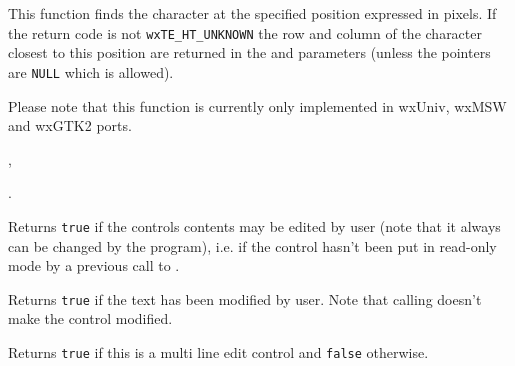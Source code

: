\label{wxtextctrlhittest}


This function finds the character at the specified position expressed in
pixels. If the return code is not \texttt{wxTE\_HT\_UNKNOWN} the row and column
of the character closest to this position are returned in the  and 
 parameters (unless the pointers are {\tt NULL} which is allowed).

Please note that this function is currently only implemented in wxUniv,
wxMSW and wxGTK2 ports.


, 

.

\label{wxtextctrliseditable}


Returns {\tt true} if the controls contents may be edited by user (note that it
always can be changed by the program), i.e. if the control hasn't been put in
read-only mode by a previous call to 
.


\label{wxtextctrlismodified}


Returns {\tt true} if the text has been modified by user. Note that calling 
 doesn't make the control modified.


\label{wxtextctrlismultiline}


Returns {\tt true} if this is a multi line edit control and {\tt false}
otherwise.




\label{wxtextctrlissingleline}


